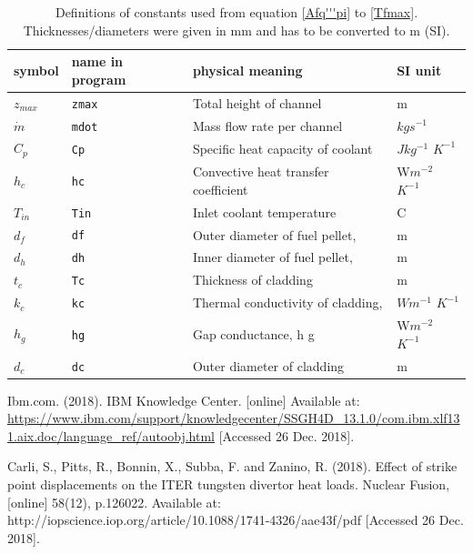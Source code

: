 \documentclass[a4paper, 12pt]{article}
\begin{document}
\begin{appendices}
\begin{center}
\begin{table}[h!b]
\begin{tabular}{llll}
\hline
symbol&name in program&physical meaning & SI unit\\
\hline
$z_{max}$&\texttt{zmax}&Total height of channel 				&m\\
$\dot{m}$&\texttt{mdot}&Mass flow rate per channel 		&$kgs^{-1}$ \\
$C_p$	&\texttt{Cp}&Specific heat capacity of coolant 		&$Jkg^{-1}$ $K^{-1}$ \\
$h_c$	&\texttt{hc}&Convective heat transfer coefficient&W$m^{-2}$ $K^{-1}$ \\
$T_{in}$&\texttt{Tin}&Inlet coolant temperature 			& \textdegree C\\
\hline
$d_f$	&\texttt{df}&Outer diameter of fuel pellet, &m\\
$d_h$	&\texttt{dh}&Inner diameter of fuel pellet, &m\\
\hline
$t_c$	&\texttt{Tc}&Thickness of cladding &m\\
$k_c$	&\texttt{kc}&Thermal conductivity of cladding,  &$Wm^{-1}$ $K^{-1}$ \\
$h_g$	&\texttt{hg}&Gap conductance, h g &W$m^{-2}$ $K^{-1}$ \\
\hline
$d_c$	&\texttt{dc}&Outer diameter of cladding&m\\
\hline

\end{tabular}
\caption{Definitions of constants used from equation \ref{Afq'''pi} to \ref{Tfmax}.   Thicknesses/diameters were given in mm and has to be converted to m (SI).}\label{table2}
\end{table}
\end{center}

\end{appendices}

\begin{thebibliography}{1}

Ibm.com. (2018). IBM Knowledge Center. [online] Available at: \url{https://www.ibm.com/support/knowledgecenter/SSGH4D_13.1.0/com.ibm.xlf131.aix.doc/language_ref/autoobj.html} [Accessed 26 Dec. 2018].

Carli, S., Pitts, R., Bonnin, X., Subba, F. and Zanino, R. (2018). Effect of strike point displacements on the ITER tungsten divertor heat loads. Nuclear Fusion, [online] 58(12), p.126022. Available at: http://iopscience.iop.org/article/10.1088/1741-4326/aae43f/pdf [Accessed 26 Dec. 2018].
\end  {thebibliography}

\end{document}
